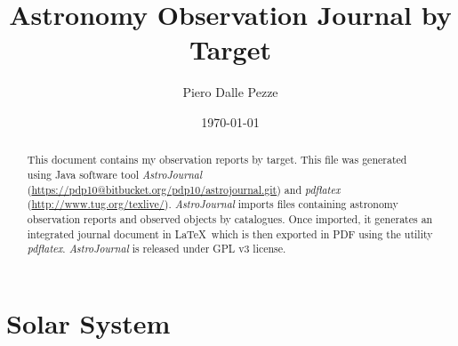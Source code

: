 \documentclass[10pt,twoside,a4paper,english]{article}
\title{Astronomy Observation Journal by Target}
\author{Piero Dalle Pezze}
\date{\today}
\begin{document}
 
 
\maketitle 
\thispagestyle{empty} 
 
\begin{abstract} 
This document contains my observation reports by target. This file was generated using Java software tool {\it AstroJournal} (\href{https://pdp10@bitbucket.org/pdp10/astrojournal.git}{https://pdp10@bitbucket.org/pdp10/astrojournal.git}) and {\it pdflatex} (\href{http://www.tug.org/texlive/}{http://www.tug.org/texlive/}). {\it AstroJournal} imports files containing astronomy observation reports and observed objects by catalogues. Once imported, it generates an integrated journal document in \LaTeX\ which is then exported in PDF using the utility {\it pdflatex}. {\it AstroJournal} is released under GPL v3 license. 
\end{abstract} 
 
\tableofcontents 
 
 
\clearpage 
 
 
\small 
 
\clearpage 
 
 
\normalsize 
\clearpage
\section{Solar System}

\vspace{4 mm}

\vspace{4 mm}

\vspace{4 mm}

\vspace{4 mm}

\vspace{4 mm}

\vspace{4 mm}

\vspace{4 mm}

\vspace{4 mm}

\vspace{4 mm}
\clearpage
\end{document}
